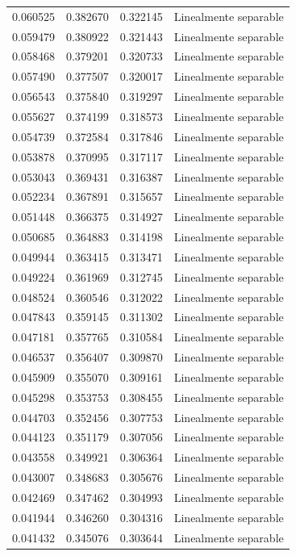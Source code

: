 \begin{tabular}{llll}
0.060525 & 0.382670 & 0.322145 & Linealmente separable \\
0.059479 & 0.380922 & 0.321443 & Linealmente separable \\
0.058468 & 0.379201 & 0.320733 & Linealmente separable \\
0.057490 & 0.377507 & 0.320017 & Linealmente separable \\
0.056543 & 0.375840 & 0.319297 & Linealmente separable \\
0.055627 & 0.374199 & 0.318573 & Linealmente separable \\
0.054739 & 0.372584 & 0.317846 & Linealmente separable \\
0.053878 & 0.370995 & 0.317117 & Linealmente separable \\
0.053043 & 0.369431 & 0.316387 & Linealmente separable \\
0.052234 & 0.367891 & 0.315657 & Linealmente separable \\
0.051448 & 0.366375 & 0.314927 & Linealmente separable \\
0.050685 & 0.364883 & 0.314198 & Linealmente separable \\
0.049944 & 0.363415 & 0.313471 & Linealmente separable \\
0.049224 & 0.361969 & 0.312745 & Linealmente separable \\
0.048524 & 0.360546 & 0.312022 & Linealmente separable \\
0.047843 & 0.359145 & 0.311302 & Linealmente separable \\
0.047181 & 0.357765 & 0.310584 & Linealmente separable \\
0.046537 & 0.356407 & 0.309870 & Linealmente separable \\
0.045909 & 0.355070 & 0.309161 & Linealmente separable \\
0.045298 & 0.353753 & 0.308455 & Linealmente separable \\
0.044703 & 0.352456 & 0.307753 & Linealmente separable \\
0.044123 & 0.351179 & 0.307056 & Linealmente separable \\
0.043558 & 0.349921 & 0.306364 & Linealmente separable \\
0.043007 & 0.348683 & 0.305676 & Linealmente separable \\
0.042469 & 0.347462 & 0.304993 & Linealmente separable \\
0.041944 & 0.346260 & 0.304316 & Linealmente separable \\
0.041432 & 0.345076 & 0.303644 & Linealmente separable \\

\end{tabular}
